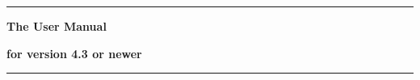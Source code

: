 \thispagestyle{empty}
\begin{titlepage}


\rule{\linewidth}{0.5mm}
  \Large
  \textbf{The \aevol{} User Manual}

  \vspace{0.5cm}
   
  \normalsize
  \textbf{for version 4.3 or newer}

 \rule{\linewidth}{0.5mm}
 
\end{titlepage}

\clearemptydoublepage